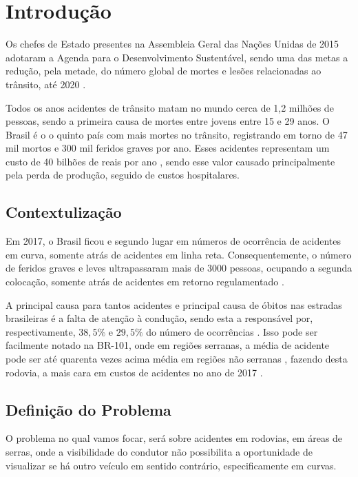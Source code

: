 \chapter{Introdução}

Os chefes de Estado presentes na Assembleia Geral das Nações Unidas de 2015 adotaram a Agenda para o Desenvolvimento Sustentável, sendo uma das metas a redução, pela metade, do número global de mortes e lesões relacionadas ao trânsito, até 2020 \cite{relatorio_oms}.

Todos os anos acidentes de trânsito matam no mundo cerca de 1,2 milhões de pessoas, sendo a primeira causa de mortes entre jovens entre 15 e 29 anos. O Brasil é o o quinto país com mais mortes no trânsito, registrando em torno de 47 mil mortos e 300 mil feridos graves por ano. Esses acidentes representam um custo de 40 bilhões de reais por ano \cite{relatorio_ipea}, sendo esse valor causado principalmente pela perda de produção, seguido de custos hospitalares.

\section{Contextulização}

 Em 2017, o Brasil ficou e segundo lugar em números de ocorrência de acidentes em curva, somente atrás de acidentes em linha reta. Consequentemente, o número de feridos graves e leves ultrapassaram mais de 3000 pessoas, ocupando a segunda colocação, somente atrás de acidentes em retorno regulamentado \cite{anuario_rodoviario}.

A principal causa para tantos acidentes e principal causa de óbitos nas estradas brasileiras é a falta de atenção à condução, sendo esta a responsável por, respectivamente, $38,5\%$ e $29,5\%$ do número de ocorrências \cite{anuario_rodoviario}. Isso pode ser facilmente notado na BR-101, onde em regiões serranas, a média de acidente pode ser até quarenta vezes acima média em regiões não serranas \cite{acidentes}, fazendo desta rodovia, a mais cara em custos de acidentes no ano de 2017 \cite{anuario_rodoviario}.


\section{Definição do Problema}

O problema no qual vamos focar, será sobre acidentes em rodovias, em áreas de serras, onde a visibilidade do condutor não possibilita a oportunidade de visualizar se há outro veículo em sentido contrário, especificamente em curvas.

